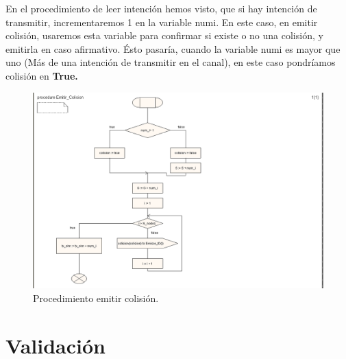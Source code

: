 \documentclass{article}
\begin{document}
En el procedimiento de leer intención hemos visto, que si hay intención de transmitir, incrementaremos 1 en la variable numi. En este caso, en emitir colisión, usaremos esta variable para confirmar si existe o no una colisión, y emitirla en caso afirmativo. Ésto pasaría, cuando la variable numi es mayor que uno (Más de una intención de transmitir en el canal), en este caso pondríamos colisión en \textbf{True.}

\quad

\begin{figure}[h]
    \centering
    \includegraphics[width=0.8\linewidth]{src/proc emitir col.png}
    \caption{\label{fig:emitircol} Procedimiento emitir colisión.}
\end{figure}
\newpage

\section{Validación}
\end{document}
